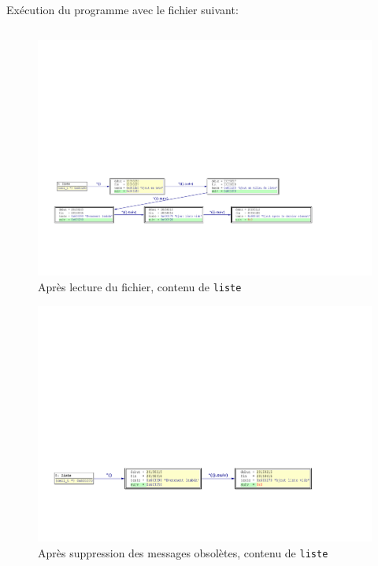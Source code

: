 Exécution du programme avec le fichier suivant:
\inputminted[frame=single,label=Test]{text}{../tests/test_insert}

\begin{figure}[H]
	\centering
	\includegraphics[width=18cm,clip=true,trim=1cm 4cm 5cm 12cm]{../tests/ddd_graph/chargement}
	\caption{Après lecture du fichier, contenu de \texttt{liste}}
\end{figure}

\begin{figure}[h!]
	\centering
	\includegraphics[width=15cm,clip=true,trim=1cm 4cm 5cm 14cm]{../tests/ddd_graph/nettoyage}
	\caption{Après suppression des messages obsolètes, contenu de \texttt{liste}}
\end{figure}

